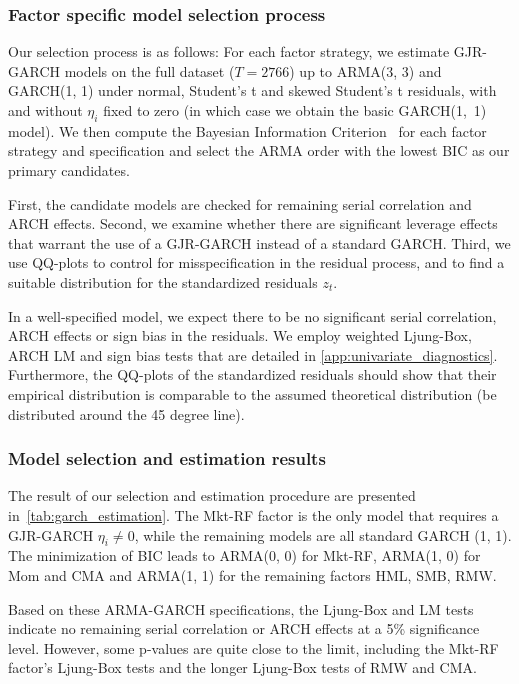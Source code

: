 \subsubsection{Factor specific model selection process}

Our selection process is as follows: For each factor strategy, we estimate GJR-GARCH models on the full dataset ($T = 2766$) up to ARMA(3, 3) and GARCH(1, 1) under normal, Student's t and skewed Student's t residuals, with and without $\eta_i$ fixed to zero (in which case we obtain the basic GARCH(1,~1) model). We then compute the Bayesian Information Criterion~\autocite[BIC]{Schwarz1978} for each factor strategy and specification and select the ARMA order with the lowest BIC as our primary candidates.

First, the candidate models are checked for remaining serial correlation and ARCH effects. Second, we examine whether there are significant leverage effects that warrant the use of a GJR-GARCH instead of a standard GARCH. Third, we use QQ-plots to control for misspecification in the residual process, and to find a suitable distribution for the standardized residuals $z_t$.

In a well-specified model, we expect there to be no significant serial correlation, ARCH effects or sign bias in the residuals. We employ weighted Ljung-Box, ARCH LM and sign bias tests that are detailed in \autoref{app:univariate_diagnostics}. Furthermore, the QQ-plots of the standardized residuals should show that their empirical distribution is comparable to the assumed theoretical distribution (be distributed around the 45 degree line).

\subsubsection{Model selection and estimation results}

The result of our selection and estimation procedure are presented in~\autoref{tab:garch_estimation}. The Mkt-RF factor is the only model that requires a GJR-GARCH $\eta_i \neq 0$, while the remaining models are all standard GARCH (1, 1). The minimization of BIC leads to ARMA(0, 0) for Mkt-RF, ARMA(1, 0) for Mom and CMA and ARMA(1, 1) for the remaining factors HML, SMB, RMW. 



Based on these ARMA-GARCH specifications, the Ljung-Box and LM tests indicate no remaining serial correlation or ARCH effects at a 5\% significance level. However, some p-values are quite close to the limit, including the Mkt-RF factor's Ljung-Box tests and the longer Ljung-Box tests of RMW and CMA.

